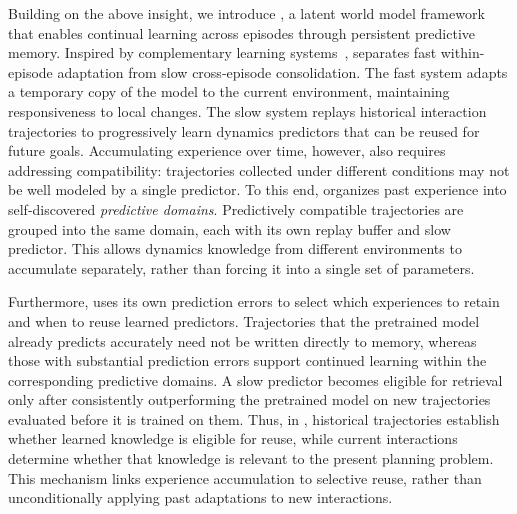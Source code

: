 Building on the above insight, we introduce \ours{}, a latent world model framework that enables continual learning across episodes through persistent predictive memory. Inspired by complementary learning systems~\cite{mcclelland1995cls}, \ours{} separates fast within-episode adaptation from slow cross-episode consolidation. The fast system adapts a temporary copy of the model to the current environment, maintaining responsiveness to local changes. The slow system replays historical interaction trajectories to progressively learn dynamics predictors that can be reused for future goals. Accumulating experience over time, however, also requires addressing compatibility: trajectories collected under different conditions may not be well modeled by a single predictor. To this end, \ours{} organizes past experience into self-discovered \emph{predictive domains}. Predictively compatible trajectories are grouped into the same domain, each with its own replay buffer and slow predictor. This allows dynamics knowledge from different environments to accumulate separately, rather than forcing it into a single set of parameters.

Furthermore, \ours{} uses its own prediction errors to select which experiences to retain and when to reuse learned predictors. Trajectories that the pretrained model already predicts accurately need not be written directly to memory, whereas those with substantial prediction errors support continued learning within the corresponding predictive domains. A slow predictor becomes eligible for retrieval only after consistently outperforming the pretrained model on new trajectories evaluated before it is trained on them. Thus, in \ours{}, historical trajectories establish whether learned knowledge is eligible for reuse, while current interactions determine whether that knowledge is relevant to the present planning problem. This mechanism links experience accumulation to selective reuse, rather than unconditionally applying past adaptations to new interactions.

